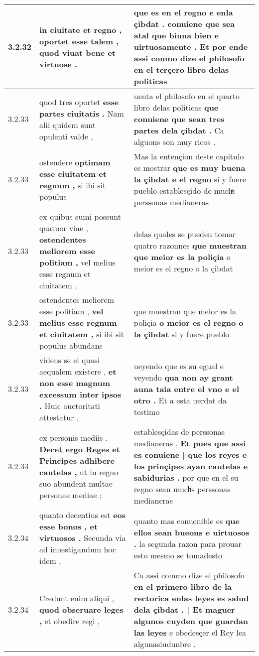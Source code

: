 \begin{tabular}{|p{1cm}|p{6.5cm}|p{6.5cm}|}
3.2.32 & in ciuitate et regno , \textbf{ oportet esse talem , } quod viuat bene et virtuose . & que es en el regno e enla çibdat . \textbf{ conuiene que sea atal que biuna bien e uirtuosamente . } Et por ende assi conmo dize el philosofo en el terçero libro delas politicas \\\hline
3.2.33 & quod tres oportet \textbf{ esse partes ciuitatis . } Nam alii quidem sunt opulenti valde , & uenta el philosofo en el quarto libro delas politicas \textbf{ que conuiene que sean tres partes dela çibdat . } Ca alguons son muy ricos . \\\hline
3.2.33 & ostendere \textbf{ optimam esse ciuitatem et regnum , } si ibi sit populus & Mas la entençion deste capitulo es mostrar \textbf{ que es muy buena la çibdat e el regno } si y fuere pueblo establesçido de muchͣs perssonas medianeras \\\hline
3.2.33 & ex quibus sumi possunt quatuor viae , \textbf{ ostendentes meliorem esse politiam , } vel melius esse regnum et ciuitatem , & delas quales se pueden tomar quatro razonnes \textbf{ que muestran que meior es la poliçia } o meior es el regno o la çibdat \\\hline
3.2.33 & ostendentes meliorem esse politiam , \textbf{ vel melius esse regnum et ciuitatem , } si ibi sit populus abundans & que muestran que meior es la poliçia \textbf{ o meior es el regno o la çibdat } si y fuere pueblo \\\hline
3.2.33 & videns se ei quasi aequalem existere , \textbf{ et non esse magnum excessum inter ipsos . } Huic auctoritati attestatur , & ueyendo que es su egual e veyendo \textbf{ qua non ay grant auna taia entre el vno e el otro . } Et a esta uerdat da testimo \\\hline
3.2.33 & ex personis mediis . \textbf{ Decet ergo Reges et Principes adhibere cautelas , } ut in regno suo abundent multae personae mediae ; & establesçidas de perssonas medianeras . \textbf{ Et pues que assi es conuiene | que los reyes e los prinçipes ayan cautelas e sabidurias . } por que en el su regno sean muchͣs perssonas medianeras \\\hline
3.2.34 & quanto decentius est \textbf{ eos esse bonos , et virtuosos . } Secunda via ad inuestigandum hoc idem , & quanto mas conuenible es \textbf{ que ellos sean bueons e uirtuosos . } la segunda razon para prouar esto mesmo se tomadesto \\\hline
3.2.34 & Credunt enim aliqui , \textbf{ quod obseruare leges , } et obedire regi , & Ca assi commo dize el philosofo \textbf{ en el primero libro de la rectorica enlas leyes es salud dela çibdat . | Et maguer algunos cuyden que guardan las leyes } e obedesçer el Rey lea algunasiudunbre . \\\hline

\end{tabular}
